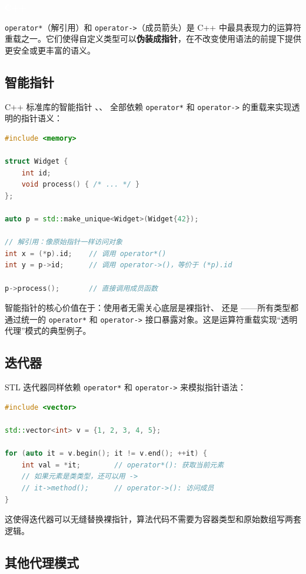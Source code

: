 \documentclass[12pt,a4paper,fontset=fandol]{ctexbook}
\newcommand{\cpp}[1]{C++#1}
\newcommand{\Op}[1]{\texttt{operator#1}}
\newcommand{\cpplabel}{%
  \noindent\begin{tcolorbox}[sharp corners,colback=algheadbg,colframe=algheadbg,
    left=6pt,right=6pt,top=2pt,bottom=2pt,boxrule=0pt]
  \textcolor{white}{\small\bfseries\sffamily C++}\end{tcolorbox}%
}
\begin{document}
\cpplabel

\Op{*}（解引用）和 \Op{->}（成员箭头）是 \cpp{} 中最具表现力的运算符重载之一。它们使得自定义类型可以\textbf{伪装成指针}，在不改变使用语法的前提下提供更安全或更丰富的语义。

\subsection{智能指针}

\cpp{} 标准库的智能指针 、、 全部依赖 \Op{*} 和 \Op{->} 的重载来实现透明的指针语义：

\begin{lstlisting}[language=C++]
#include <memory>

struct Widget {
    int id;
    void process() { /* ... */ }
};

auto p = std::make_unique<Widget>(Widget{42});

// 解引用：像原始指针一样访问对象
int x = (*p).id;    // 调用 operator*()
int y = p->id;      // 调用 operator->()，等价于 (*p).id

p->process();       // 直接调用成员函数
\end{lstlisting}

智能指针的核心价值在于：使用者无需关心底层是裸指针、 还是 ——所有类型都通过统一的 \Op{*} 和 \Op{->} 接口暴露对象。这是运算符重载实现``透明代理''模式的典型例子。

\subsection{迭代器}

STL 迭代器同样依赖 \Op{*} 和 \Op{->} 来模拟指针语法：

\begin{lstlisting}[language=C++]
#include <vector>

std::vector<int> v = {1, 2, 3, 4, 5};

for (auto it = v.begin(); it != v.end(); ++it) {
    int val = *it;        // operator*(): 获取当前元素
    // 如果元素是类类型，还可以用 ->
    // it->method();      // operator->(): 访问成员
}
\end{lstlisting}

这使得迭代器可以无缝替换裸指针，算法代码不需要为容器类型和原始数组写两套逻辑。

\subsection{其他代理模式}
\end{document}

